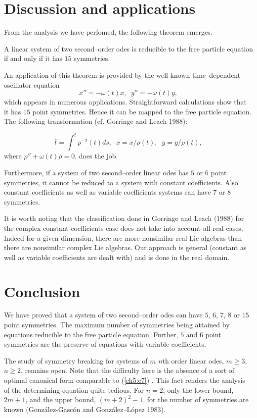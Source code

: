 \section{Discussion and  applications}
From the analysis we have perfomed, the following theorem emerges.
\begin{theo}
\label{ch5:t3}
\begin{em}
A linear system of two second--order odes is reducible to the free particle
equation if and only if it has $15$ symmetries.
\end{em}
\end{theo}
An application of this theorem is provided by the well-known
time--dependent oscillator equation
\[x''=-\omega (t)x,\;\;y''=-\omega (t) y,\]
which appears in numerous applications. Straightforward calculations show
that it has $15$  point symmetries. Hence it can be mapped to the free particle
equation.
The following transformation (cf. Gorringe and Leach 1988):

\begin{equation}
 \bar t=\int^t \rho^{-2}(t) ds,\;\;\bar x=x/\rho (t) ,
\;\;\bar y=y/\rho (t), \label{ch5:os} 
\end{equation}
where $\rho ''+\omega (t) \rho =0$, does the job. 

Furthermore, if a system of two second--order linear odes has $5$ or $6$
point symmetries, it cannot be reduced to a system with constant coefficients.
Also constant coefficients as well as variable coefficients systems can
have $7$ or $8$ symmetries.

It is worth noting that the classification done in Gorringe and Leach (1988)
for the complex constant
coefficients case does not take into account all real cases.
Indeed for a given dimension, there are more nonsimilar real Lie algebras
than there are nonsimilar complex Lie algebras. Our approach is general
(constant as well as variable coefficients are dealt with) and is done in the
real domain.

\section{Conclusion}
We have proved that a system of two second--order odes can have $5$, $6$,
$7$, $8$ or $15$ point symmetries. The maximum number of symmetries being
attained by equations reducible to the free particle equation.
Further, $5$ and $6$ point 
symmetries are the preserve of equations with variable coefficients.

The study of symmetry breaking for systems of $m$ $n$th order linear odes, $m\ge 3$,
$n\ge 2$, remains open.  Note that the difficulty here is the absence of a sort
of optimal canonical form comparable to (\ref{ch5:c7})
. This fact renders the analysis of the determining
equation quite tedious. For $n=2$, only the lower bound, $2m+1$,
and the upper bound, $(m+2)^2-1$, for the number of
symmetries are known (Gonz\'alez-Gasc\'on and Gonz\'alez--L\'opez 1983).

%




